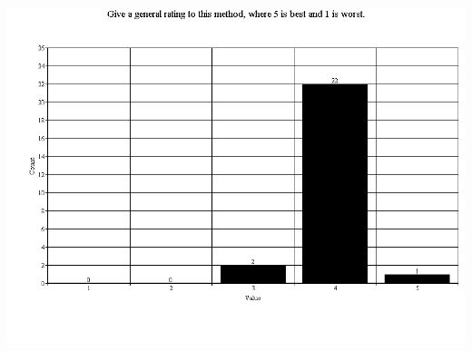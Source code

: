 \documentclass[twoside,11pt]{Latex/Classes/PhDthesisPSnPDF}
\begin{document}
\chapter{}
\includegraphics[scale=0.5]{Images/q14}



\begin{multicols}{2} %
\begin{tiny} %





\end{tiny}
\end{multicols}

\end{document}
